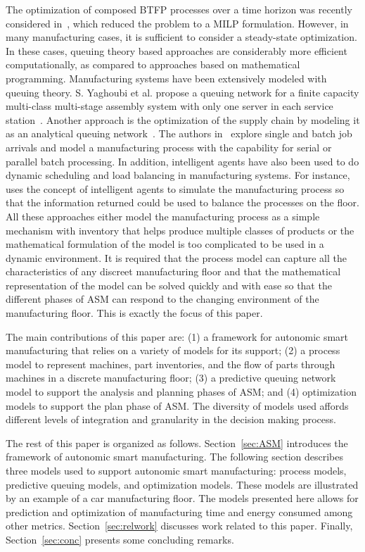 \documentclass[a4paper, 12pt]{article} %
\begin{document}
The optimization of composed BTFP processes over a time horizon was recently considered in~\cite{IJOC}, which reduced the problem to a  MILP formulation. However, in many manufacturing cases, it is sufficient to consider a steady-state optimization. In these cases, queuing theory based approaches are considerably more efficient computationally, as compared to approaches based on mathematical programming. Manufacturing systems have been extensively modeled with queuing theory. S. Yaghoubi et al. propose a queuing network for a finite capacity multi-class multi-stage assembly system with only one server in each service station~\cite{Yaghoubi2013}. Another approach is the optimization of the supply chain by modeling it  as an analytical queuing network~\cite{Kerbache2004}. The authors in~\cite{Wu2014} explore single and batch job arrivals and model a manufacturing process with the capability for serial or parallel batch processing. In addition, intelligent agents have also been used to do dynamic scheduling and load balancing in manufacturing systems. For instance,~\cite{Nadoli1993}\cite{Balic2007} uses the concept of intelligent agents to simulate the manufacturing process so that the information returned could be used to balance the processes on the floor.  All these approaches either model the manufacturing process as a simple mechanism with inventory that helps produce multiple classes of products or the mathematical formulation of the model is too complicated to be used in a dynamic environment. It is required that the process model can capture all the characteristics of any discreet manufacturing floor and that the mathematical representation of the model can be solved quickly and with ease so that the different phases of ASM can respond to the changing environment of the manufacturing floor. This is exactly the focus of this paper.

The main contributions of this paper are: (1) a framework for autonomic smart manufacturing that relies on a variety of models for its support; (2) a process model to represent machines, part inventories, and the flow of parts through
machines in a discrete manufacturing floor; (3) a predictive queuing network model to support the analysis and planning phases of ASM; and (4) optimization models to support the plan phase of ASM. The diversity of models used affords different levels of integration and granularity in the decision making process.


The rest of this paper is organized as follows. Section~\ref{sec:ASM} introduces the framework of autonomic smart manufacturing. The following section describes three models used to support autonomic smart manufacturing: process models, predictive queuing models, and optimization models. These models are illustrated by an example of a car manufacturing floor. The models presented here allows for prediction and optimization of manufacturing time and energy consumed among other metrics. Section~\ref{sec:relwork} discusses work related to this paper. Finally, Section~\ref{sec:conc} presents some concluding remarks.
\end{document}
